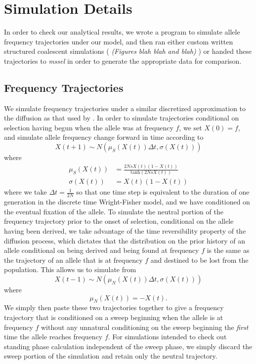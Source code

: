 \documentclass[a4paper,10pt]{article}
\newcommand{\jb}[1]{{\it\color{blue} (#1)} }
\begin{document}
\section{Simulation Details}
In order to check our analytical results, we wrote a program to simulate allele frequency trajectories under our model, and then ran either custom written structured coalescent simulations (\jb{Figures blah blah and blah}) or handed these trajectories to \textit{mssel} in order to generate the appropriate data for comparison. 

\subsection*{Frequency Trajectories}
We simulate frequency trajectories under a similar discretized approximation to the diffusion as that used by \cite{Przeworski2005}. In order to simulate trajectories conditional on selection having begun when the allele was at frequency $f$, we set $X\left(0\right) = f$, and simulate allele frequency change forward in time according to
\begin{equation}
	X\left({t+1}\right) \sim N \left( \mu_S\left(X\left(t\right)\right)\Delta t , \sigma\left(X\left(t\right)\right) \right)
\end{equation}
where
\begin{align}
	\mu_S\left(X\left(t\right)\right) &= \frac{2NsX\left(t\right)\left(1-X\left(t\right)\right)}{\textrm{tanh}\left(2NsX\left(t\right)\right)} \\
	\sigma\left(X\left(t\right)\right) &= X\left(t\right)\left(1-X\left(t\right)\right)
\end{align}
where we take $\Delta t = \frac{1}{2N}$ so that one time step is equivalent to the duration of one generation in the discrete time Wright-Fisher model, and we have conditioned on the eventual fixation of the allele. To simulate the neutral portion of the frequency trajectory prior to the onset of selection, conditional on the allele having been derived, we take advantage of the time reversibility property of the diffusion process, which dictates that the distribution on the prior history of an allele conditional on being derived and being found at frequency $f$ is the same as the trajectory of an allele that is at frequency $f$ and destined to be lost from the population. This allows us to simulate from
\begin{equation}
	X\left(t-1\right) \sim N\left(\mu_N\left(X\left(t\right)\right) \Delta t, \sigma \left( X\left(t\right) \right)\right)
\end{equation}
where
\begin{equation}
	\mu_N\left(X\left(t\right)\right) = - X\left(t\right).
\end{equation}
We simply then paste these two trajectories together to give a frequency trajectory that is conditioned on a sweep beginning when the allele is at frequency $f$ without any unnatural conditioning on the sweep beginning the \textit{first} time the allele reaches frequency $f$. For simulations intended to check out standing phase calculation independent of the sweep phase, we simply discard the sweep portion of the simulation and retain only the neutral trajectory.
\end{document}
